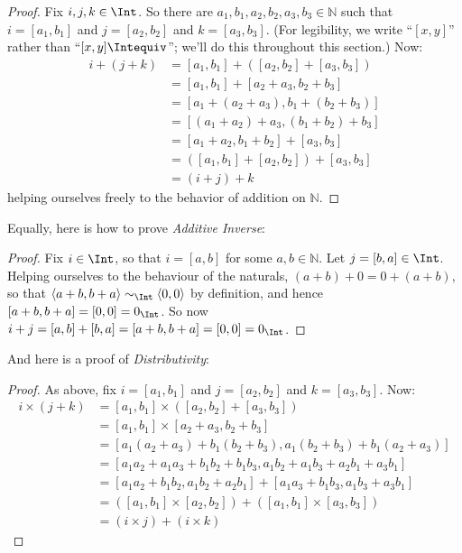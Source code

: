 \documentclass[10pt,a4paper]{article}
\theoremstyle{plain}
\theoremstyle{definition}
\theoremstyle{remark}
\providecommand{\tuple}[1]{\langle #1 \rangle}
\providecommand{\Nat}{\ensuremath{\mathbb{N}}}
\providecommand{\equivrep}[1]{[#1]}
\begin{document}
\begin{proof} 
Fix $i, j, k \in \Int$. So there are $a_1, b_1, a_2, b_2, a_3, b_3 \in
\Nat$ such that $i = \equivrep{a_1, b_1}{}$ and $j =
\equivrep{a_2,b_2}{}$ and $k = \equivrep{a_3, b_3}{}$. (For
legibility, we write ``$\equivrep{x, y}{}$'' rather than
``$\equivrep{x, y}{\Intequiv}$''; we'll do this throughout this
section.) Now:
\begin{align*}
	i + (j + k) &= \equivrep{a_1, b_1}{}+(\equivrep{a_2, b_2}{} + \equivrep{a_3, b_3}{}) \\
	&= \equivrep{a_1,  b_1}{} + \equivrep{a_2+a_3, b_2+b_3}{}\\
	&= \equivrep{a_1 + (a_2 + a_3), b_1 + (b_2 + b_3)}{}\\
	&= \equivrep{(a_1 + a_2) + a_3, (b_1 + b_2) + b_3}{}\\
	&= \equivrep{a_1 + a_2, b_1 + b_2}{} + \equivrep{a_3, b_3}{}\\
	&= (\equivrep{a_1, b_1}{} + \equivrep{a_2, b_2}{}) + \equivrep{a_3, b_3}{}\\
	&= (i+j) + k
\end{align*}
helping ourselves freely to the behavior of addition on $\Nat$.
\end{proof}

Equally, here is how to prove \emph{Additive Inverse}:

\begin{proof}
Fix $i \in \Int$, so that $i = \equivrep{a,b}{}$ for some $a,b \in
\Nat$. Let $j = \equivrep{b,a}{} \in \Int$. Helping ourselves to the
behaviour of the naturals, $(a+b) + 0 = 0 + (a+b)$, so that
$\tuple{a+b, b+a} \sim_\Int \tuple{0,0}$ by definition, and hence
$\equivrep{a+b, b+a}{} = \equivrep{0, 0}{} = 0_\Int$. So now $i + j =
\equivrep{a,b}{}+\equivrep{b,a}{}=\equivrep{a+b, b+a}{}= \equivrep{0,
0}{} = 0_\Int$.
\end{proof}

And here is a proof of \emph{Distributivity}:

\begin{proof}
As above, fix $i = \equivrep{a_1, b_1}{}$ and $j =
\equivrep{a_2,b_2}{}$ and $k = \equivrep{a_3, b_3}{}$. Now:
\begin{align*}
	i \times (j + k) 
	&= \equivrep{a_1, b_1}{} \times (\equivrep{a_2,b_2}{} + \equivrep{a_3, b_3}{})\\
	&= \equivrep{a_1, b_1}{} \times \equivrep{a_2 + a_3,b_2+b_3}{}\\
	&= \equivrep{a_1  (a_2 + a_3) + b_1  (b_2+b_3), a_1  (b_2 + b_3) + b_1 (a_2 + a_3)}{}\\
	&= \equivrep{a_1 a_2 + a_1a_3 + b_1 b_2+b_1b_3, a_1 b_2 + a_1b_3 + a_2b_1 + a_3b_1}{}\\		
	&= \equivrep{a_1a_2 + b_1b_2, a_1b_2 + a_2b_1}{} + \equivrep{a_1a_3 + b_1b_3, a_1b_3 + a_3b_1}{}\\
	&= (\equivrep{a_1, b_1}{} \times \equivrep{a_2,b_2}{}) + (\equivrep{a_1, b_1}{} \times  \equivrep{a_3, b_3}{})\\
	&= (i \times j) + (i \times k)
\end{align*}
\end{proof}
\end{document}
